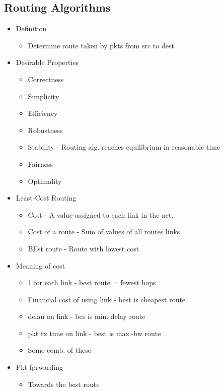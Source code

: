 \subsection{Routing Algorithms}
\begin{itemize}
	\item Definition
	\begin{itemize}
		\item Determine route taken by pkts from src to dest
	\end{itemize}
	\item Desirable Properties
	\begin{itemize}
		\item Correctness
		\item Simplicity
		\item Efficiency
		\item Robustness
		\item Stability - Routing alg. reaches equilibrium in reasonable
			time
		\item Fairness
		\item Optimality
	\end{itemize}
	\item Least-Cost Routing
	\begin{itemize}
		\item Cost - A value assigned to each link in the net.
		\item Cost of a route - Sum of values of all routes links
		\item BEst route - Route with lowest cost
	\end{itemize}
	\item Meaning of cost
	\begin{itemize}
		\item 1 for each link - best route = fewest hops
		\item Financial cost of using link - best is cheapest route
		\item delau on link - bes is min.-delay route
		\item pkt tx time on link - best is max.-bw route
		\item Some comb. of these
	\end{itemize}
	\item Pkt fprwarding
	\begin{itemize}
		\item Towards the best route
	\end{itemize}
\end{itemize}
